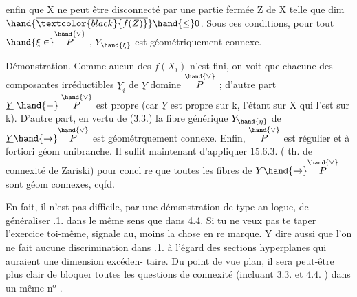 enfin que X ne peut être disconnecté par une partie fermée Z de X telle
que dim $\hand{\overline{\textcolor{black}{f(Z)}}} \hand{\leq} 0$.    Sous ces conditions, pour tout $\hand{\xi \in} \overset{\hand{\vee}}{P}$ , $Y_{\hand{\xi}}$ est
géométriquement connexe.

Démonstration.  Comme  aucun des $f(X_i)$ n'est fini, on voit
que chacune des composantes irréductibles $\underline{Y}_i$ de $\underline{Y}$ domine $\overset{\hand{\vee}}{P}$ ;
d'autre part $\underline{Y} \mathrel{\hand{-}} \overset{\hand{\vee}}{P}$ est propre (car $\underline{Y}$ est propre sur k, l'étant sur X
qui l'est sur k).  D'autre part, en vertu de (3.3.) la fibre générique
$Y_{\hand{\eta}}$ de $\underline{Y} \hand{\to} \overset{\hand{\vee}}{P}$ est géométrquement connexe. Enfin, $\overset{\hand{\vee}}{P}$ est régulier et
à fortiori géom unibranche. Il suffit maintenant d'appliquer 15.6.3.
( th. de connexité  de Zariski) pour concl
re que \uline{toutes} les fibres  de $\underline{Y} \hand{\to} \overset{\hand{\vee}}{P}$ sont géom connexes, cqfd.

\margin{$|$} En fait,  il n'est pas difficile, par une démsnstration de type an
logue, de généraliser .1. dans le même sens que dans 4.4. Si tu ne
veux pas te taper l'exercice toi-même, signale au, moins la chose en re
marque. Y dire aussi que l'on ne fait aucune discrimination dans .1.
à l'égard des sections hyperplanes qui auraient une dimension excéden-%
\margin{$|$} taire.  Du point de vue plan, il sera peut-être plus clair de bloquer
toutes les questions de connexité (incluant 3.3. et 4.4. ) dans un
même n$^{\text{o}}$ .
